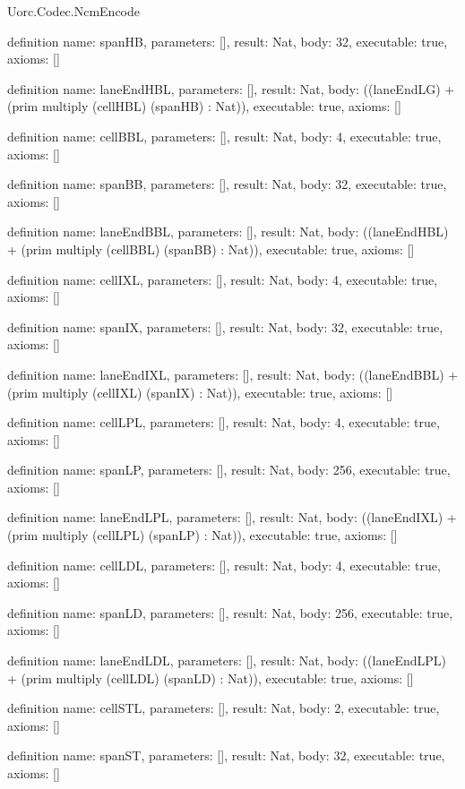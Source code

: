\begin{lexlean}{Uorc.Codec.NcmEncode}
\begin{semanticmodule}
definition{
  name: spanHB,
  parameters: [],
  result: Nat,
  body: 32,
  executable: true,
  axioms: []
}

definition{
  name: laneEndHBL,
  parameters: [],
  result: Nat,
  body: ((laneEndLG) + (prim multiply (cellHBL) (spanHB) : Nat)),
  executable: true,
  axioms: []
}

definition{
  name: cellBBL,
  parameters: [],
  result: Nat,
  body: 4,
  executable: true,
  axioms: []
}

definition{
  name: spanBB,
  parameters: [],
  result: Nat,
  body: 32,
  executable: true,
  axioms: []
}

definition{
  name: laneEndBBL,
  parameters: [],
  result: Nat,
  body: ((laneEndHBL) + (prim multiply (cellBBL) (spanBB) : Nat)),
  executable: true,
  axioms: []
}

definition{
  name: cellIXL,
  parameters: [],
  result: Nat,
  body: 4,
  executable: true,
  axioms: []
}

definition{
  name: spanIX,
  parameters: [],
  result: Nat,
  body: 32,
  executable: true,
  axioms: []
}

definition{
  name: laneEndIXL,
  parameters: [],
  result: Nat,
  body: ((laneEndBBL) + (prim multiply (cellIXL) (spanIX) : Nat)),
  executable: true,
  axioms: []
}

definition{
  name: cellLPL,
  parameters: [],
  result: Nat,
  body: 4,
  executable: true,
  axioms: []
}

definition{
  name: spanLP,
  parameters: [],
  result: Nat,
  body: 256,
  executable: true,
  axioms: []
}

definition{
  name: laneEndLPL,
  parameters: [],
  result: Nat,
  body: ((laneEndIXL) + (prim multiply (cellLPL) (spanLP) : Nat)),
  executable: true,
  axioms: []
}

definition{
  name: cellLDL,
  parameters: [],
  result: Nat,
  body: 4,
  executable: true,
  axioms: []
}

definition{
  name: spanLD,
  parameters: [],
  result: Nat,
  body: 256,
  executable: true,
  axioms: []
}

definition{
  name: laneEndLDL,
  parameters: [],
  result: Nat,
  body: ((laneEndLPL) + (prim multiply (cellLDL) (spanLD) : Nat)),
  executable: true,
  axioms: []
}

definition{
  name: cellSTL,
  parameters: [],
  result: Nat,
  body: 2,
  executable: true,
  axioms: []
}

definition{
  name: spanST,
  parameters: [],
  result: Nat,
  body: 32,
  executable: true,
  axioms: []
}


\end{semanticmodule}
\end{lexlean}
